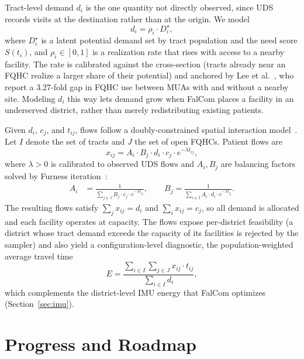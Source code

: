 \documentclass[11pt]{article}
\begin{document}
Tract-level demand $d_i$ is the one quantity not directly observed, since UDS records visits at the destination rather than at the origin. We model
\[
  d_i = \rho_i \cdot D_i^\star,
\]
where $D_i^\star$ is a latent potential demand set by tract population and the need score $S(t_i)$, and $\rho_i \in [0,1]$ is a realization rate that rises with access to a nearby facility. The rate is calibrated against the cross-section (tracts already near an FQHC realize a larger share of their potential) and anchored by Lee et al.~\cite{lee2023spatial}, who report a 3.27-fold gap in FQHC use between MUAs with and without a nearby site. Modeling $d_i$ this way lets demand grow when FalCom places a facility in an underserved district, rather than merely redistributing existing patients.

Given $d_i$, $c_j$, and $t_{ij}$, flows follow a doubly-constrained spatial interaction model~\cite{wilson1967statistical}. Let $I$ denote the set of tracts and $J$ the set of open FQHCs. Patient flows are
\begin{equation}
    x_{ij} = A_i \cdot B_j \cdot d_i \cdot c_j \cdot e^{-\lambda t_{ij}},
    \label{eq:flow}
\end{equation}
where $\lambda > 0$ is calibrated to observed UDS flows and $A_i, B_j$ are balancing factors solved by Furness iteration~\cite{furness1965trip}:
\begin{align}
    A_i &= \frac{1}{\displaystyle\sum_{j \in J} B_j \cdot c_j \cdot e^{-\lambda t_{ij}}}, \qquad
    B_j = \frac{1}{\displaystyle\sum_{i \in I} A_i \cdot d_i \cdot e^{-\lambda t_{ij}}}.
\end{align}
The resulting flows satisfy $\sum_j x_{ij} = d_i$ and $\sum_i x_{ij} = c_j$, so all demand is allocated and each facility operates at capacity. The flows expose per-district feasibility (a district whose tract demand exceeds the capacity of its facilities is rejected by the sampler) and also yield a configuration-level diagnostic, the population-weighted average travel time
\begin{equation}
    E = \frac{\displaystyle\sum_{i \in I}\sum_{j \in J} x_{ij} \cdot t_{ij}}{\displaystyle\sum_{i \in I} d_i},
    \label{eq:energy}
\end{equation}
which complements the district-level IMU energy that FalCom optimizes (Section~\ref{sec:imu}).


\section{Progress and Roadmap}\label{sec:roadmap}
\end{document}
